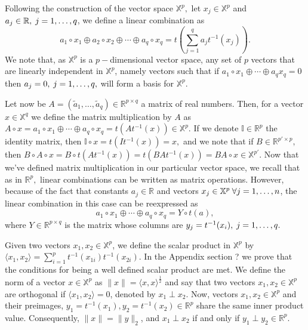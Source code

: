 \documentclass[11pt, oneside]{book}
\theoremstyle{plain}
\theoremstyle{remark}
\begin{document}
Following the construction of the vector space $\mathbb{X}^p,$ let
$x_j\in\mathbb{X}^p$ and $a_j\in\mathbb{R},\hspace{.25em} j=1,\dots,q$, we
define a linear combination as $$a_1\circ x_1\oplus a_2\circ
x_2\oplus\cdots\oplus a_q\circ x_q = t\left(\sum_{j=1}^qa_jt^{-1}(x_j)\right).$$
We note that, as $\mathbb{X}^p$ is a $p-$dimensional vector space, any set of
$p$ vectors that are linearly independent in $\mathbb{X}^p$, namely vectors such
that if $a_1\circ x_1\oplus\cdots\oplus a_qx_q = 0$ then $a_j=0,\hspace{.25em}
j=1,\dots,q,$ will form a basis for $\mathbb{X}^p.$ 

Let now be $A=(\tilde{a}_1,\dots,\tilde{a}_q)\in\mathbb{R}^{p\times q}$ a matrix
of real numbers. Then, for a vector $x\in\mathbb{X}^q$ we define the matrix
multiplication by $A$ as $A\circ x = a_1\circ x_1\oplus\cdots\oplus a_q\circ
x_q = t\left(At^{-1}(x)\right)\in\mathbb{X}^p.$ If we denote
$\mathbb{I}\in\mathbb{R}^p$ the identity matrix, then $\mathbb{I}\circ x =
t\left(It^{-1}(x)\right) = x,$ and we note that if $B\in\mathbb{R}^{p'\times
p},$ then $B\circ A\circ x = B\circ t\left(At^{-1}(x)\right) =
t\left(BAt^{-1}(x)\right) = BA\circ x\in\mathbb{X}^{p'}.$ Now that we've
defined matrix multiplication in our particular vector space, we recall that as
in $\mathbb{R}^p,$ linear combinations can be written as matrix operations.
However, because of the fact that constants $a_j\in\mathbb{R}$ and vectors
$x_j\in\mathbb{X}^p\hspace{.25em}\forall j=1,\dots,n$, the linear combination in
this case can be reexpressed as $$a_1\circ x_1\oplus\cdots\oplus a_q\circ x_q =
Y\circ t(a),$$ where $Y\in\mathbb{R}^{p\times q}$ is the matrix whose columns
are $y_j=t^{-1}(x_i),\hspace{.25em}j=1,\dots,q.$

Given two vectors $x_1,x_2\in\mathbb{X}^p$, we define the scalar product in
$\mathbb{X}^p$ by $\langle x_1,x_2\rangle =
\sum_{i=1}^pt^{-1}(x_{1i})t^{-1}(x_{2i}).$ In the Appendix section ? we prove
that the conditions for being a well defined scalar product are met. We define
the norm of a vector $x\in\mathbb{X}^p$ as $\lVert x\lVert = \langle
x,x\rangle^\frac{1}{2}$ and say that two vectors $x_1,x_2\in\mathbb{X}^p$ are
orthogonal if $\langle x_1,x_2\rangle=0$, denoted by $x_1\perp x_2$. Now,
vectors $x_1,x_2\in\mathbb{X}^p$ and their preimages, $y_1=t^{-1}(x_1),
y_2=t^{-1}(x_2)\in\mathbb{R}^p$ share the same inner product value.
Consequently, $\lVert x\lVert = \lVert y\lVert_2$, and $x_1\perp x_2$ if and
only if $y_1\perp y_2\in\mathbb{R}^p.$
\end{document}
